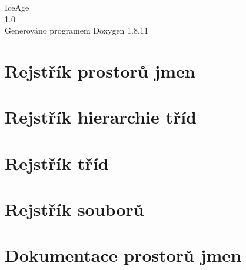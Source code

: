 \documentclass[twoside]{book}
\newcommand{\+}{\discretionary{\mbox{\scriptsize$\hookleftarrow$}}{}{}}
\newcommand{\clearemptydoublepage}{%
  \newpage{\pagestyle{empty}\cleardoublepage}%
}
\begin{document}
\hypersetup{pageanchor=false,
             bookmarksnumbered=true,
             pdfencoding=unicode
            }
\begin{titlepage}
\vspace*{7cm}
\begin{center}%
{\Large Ice\+Age \\[1ex]\large 1.\+0 }\\
\vspace*{1cm}
{\large Generováno programem Doxygen 1.8.11}\\
\end{center}
\end{titlepage}
\clearemptydoublepage
\tableofcontents
\clearemptydoublepage
{}
\hypersetup{pageanchor=true}

\chapter{Rejstřík prostorů jmen}

\chapter{Rejstřík hierarchie tříd}

\chapter{Rejstřík tříd}

\chapter{Rejstřík souborů}

\chapter{Dokumentace prostorů jmen}

\end{document}
